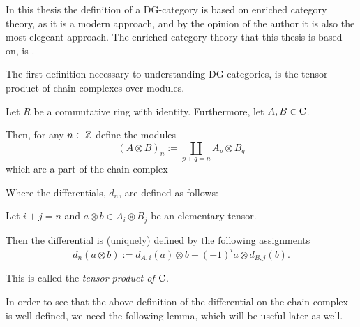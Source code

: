 In this thesis the definition of a DG-category is based on enriched category theory, as it is a modern approach, and by the opinion of the author it is also the most elegeant approach. The enriched category theory that this thesis is based on, is \cite[Section 6.2]{Borceux_1994}.

The first definition necessary to understanding DG-categories, is the tensor product of chain complexes over modules.

\begin{definition}
    \label{def:tensor_product_of_chain_complexes_over_Mod(R)}
    Let \( R \) be a commutative ring with identity. Furthermore, let \( A, B \in \operatorname{C} \).

    Then, for any  \( n \in {\mathbb{Z}} \) define the modules
    \[
        (A \otimes B)_n := \coprod_{p + q = n} A_p \otimes B_q
    \]
    which are a part of the chain complex
    \begin{center}
    \end{center}

    Where the differentials, \( d_n \), are defined as follows:
    
    Let \( i + j = n \) and \( a \otimes b \in A_i \otimes B_j \) be an elementary tensor.

    Then the differential is (uniquely) defined by the following assignments
    \[
        d_n(a \otimes b) := d_{A, i}(a) \otimes b + (-1)^{i} a \otimes d_{B, j}(b).
    \]

    This is called the \emph{tensor product of \( \operatorname{C} \)}.
\end{definition}

In order to see that the above definition of the differential on the chain complex is well defined, we need the following lemma, which will be useful later as well.

